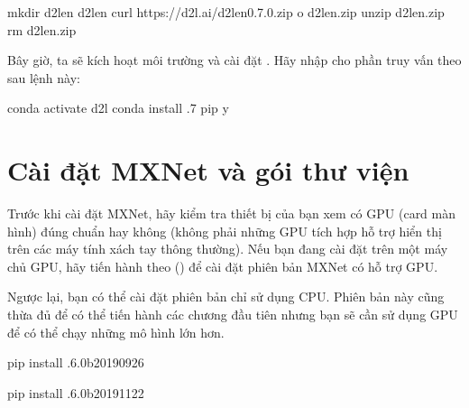 \documentclass[letterpaper,11pt,english]{sphinxmanual}
\begin{document}
\begin{sphinxVerbatim}[commandchars=\\\{\}]
mkdir d2l\PYGZhy{}en   d2l\PYGZhy{}en
curl https://d2l.ai/d2l\PYGZhy{}en\PYGZhy{}0.7.0.zip \PYGZhy{}o d2l\PYGZhy{}en.zip
unzip d2l\PYGZhy{}en.zip  rm d2l\PYGZhy{}en.zip
\end{sphinxVerbatim}



Bây giờ, ta sẽ kích hoạt môi trường  và cài đặt . Hãy nhập
 cho phần truy vấn theo sau lệnh này:

\begin{sphinxVerbatim}[commandchars=\\\{\}]
conda activate d2l
conda install .7 pip \PYGZhy{}y
\end{sphinxVerbatim}








\section{Cài đặt MXNet và gói thư viện }
\label{\detokenize{chapter_install/index_vn:cai-dat-mxnet-va-goi-thu-vien-d2l}}


Trước khi cài đặt MXNet, hãy kiểm tra thiết bị của bạn xem có GPU (card
màn hình) đúng chuẩn hay không (không phải những GPU tích hợp hỗ trợ
hiển thị trên các máy tính xách tay thông thường). Nếu bạn đang cài đặt
trên một máy chủ GPU, hãy tiến hành theo {\hyperref[\detokenize{chapter_install/index_vn:sec-gpu}]{}} () để cài đặt
phiên bản MXNet có hỗ trợ GPU.



Ngược lại, bạn có thể cài đặt phiên bản chỉ sử dụng CPU. Phiên bản này
cũng thừa đủ để có thể tiến hành các chương đầu tiên nhưng bạn sẽ cần sử
dụng GPU để có thể chạy những mô hình lớn hơn.

\begin{sphinxVerbatim}[commandchars=\\\{\}]
pip install .6.0b20190926

pip install .6.0b20191122
\end{sphinxVerbatim}
\end{document}

